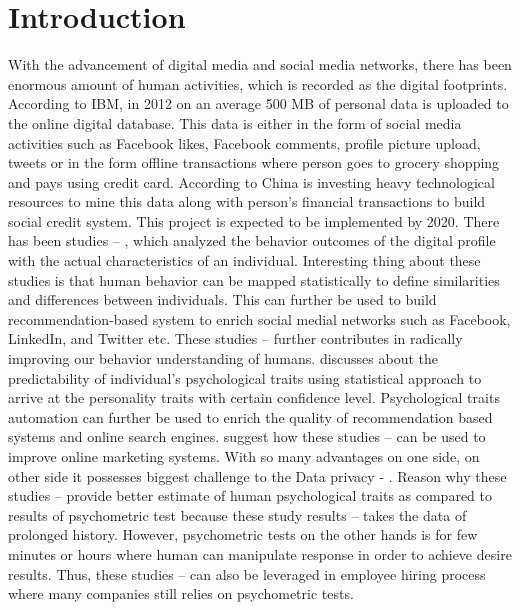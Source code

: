 \documentclass[sigconf]{acmart}
\begin{document}
\section{Introduction}
With the advancement of digital media and social media networks, there has been enormous amount of human activities, which is recorded as the digital footprints.
 According to IBM, in 2012 on an average 500 MB of personal data is uploaded to the online digital database. This data is either in the form of social media 
 activities such as Facebook likes, Facebook comments, profile picture upload, tweets or in the form offline transactions where person goes to grocery shopping 
 and pays using credit card. According to \cite{ref1} China is investing heavy technological resources to mine this data along with person’s financial transactions to
 build social credit system. This project is expected to be implemented by 2020. There has been studies \cite{ref2} – \cite{ref7}, which analyzed the behavior outcomes of 
 the digital profile with the actual characteristics of an individual. Interesting thing about these studies is that human behavior can be mapped statistically
 to define similarities and differences between individuals. This can further be used to build recommendation-based system to enrich social medial networks such 
 as Facebook, LinkedIn, and Twitter etc. These studies \cite{ref2} – \cite{ref7} further contributes in radically improving our behavior understanding of humans.
 \cite{ref4} discusses about the predictability of individual’s psychological traits using statistical approach to arrive at the personality traits with certain confidence
 level. Psychological traits automation can further be used to enrich the quality of recommendation based systems and online search engines. \cite{ref8} suggest how these
 studies \cite{ref2} – \cite{ref7} can be used to improve online marketing systems.  With so many advantages on one side, on other side it possesses biggest challenge to the
 Data privacy \cite{ref9} - \cite{ref10}.  Reason why these studies \cite{ref2} – \cite{ref7} provide better estimate of human psychological traits as compared to results of psychometric test
 because these study results \cite{ref2} – \cite{ref7} takes the data of prolonged history. However, psychometric tests on the other hands  is for few minutes or hours where
 human can manipulate response in order to achieve desire results. Thus, these studies \cite{ref2} – \cite{ref7} can also be leveraged in employee hiring process where many
 companies still relies on psychometric tests. 
\end{document}
